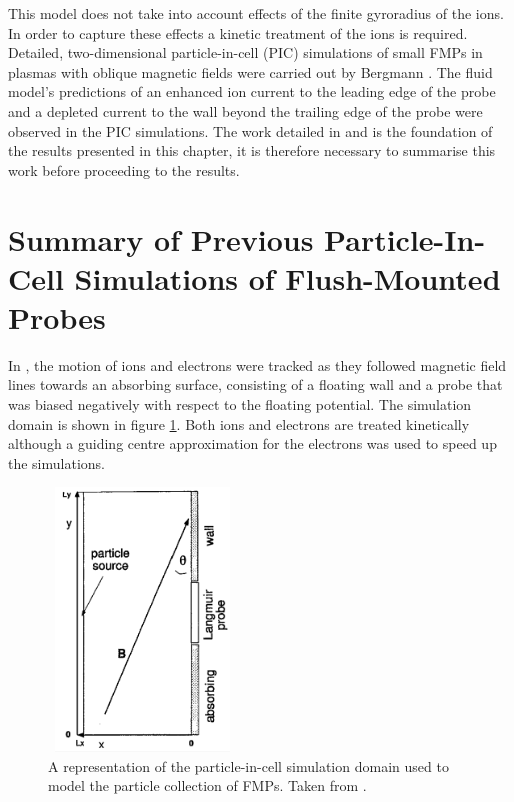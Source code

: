 This model does not take into account effects of the finite gyroradius of the ions. In order to capture these effects a kinetic treatment of the ions is required. Detailed, two-dimensional particle-in-cell (PIC) simulations of small FMPs in plasmas with oblique magnetic fields were carried out by Bergmann \cite{bergmann_1994}. The fluid model's predictions of an enhanced ion current to the leading edge of the probe and a depleted current to the wall beyond the trailing edge of the probe were observed in the PIC simulations. The work detailed in \cite{bergmann_1994} and \cite{Bergmann-2002} is the foundation of the results presented in this chapter, it is therefore necessary to summarise this work before proceeding to the results.

\section{Summary of Previous Particle-In-Cell Simulations of Flush-Mounted Probes}

In \cite{bergmann_1994}, the motion of ions and electrons were tracked as they followed magnetic field lines towards an absorbing surface, consisting of a floating wall and a probe that was biased negatively with respect to the floating potential. The simulation domain is shown in figure \ref{fig:bergmann_sim_model}. Both ions and electrons are treated kinetically although a guiding centre approximation for the electrons was used to speed up the simulations.

\begin{figure}[H]
\centering
\includegraphics[width=5cm, height = 7cm]{Bergmann_model.png}
\caption{A representation of the particle-in-cell simulation domain used to model the particle collection of FMPs. Taken from \cite{Bergmann-1994}.}
\label{fig:bergmann_sim_model}
\end{figure}

